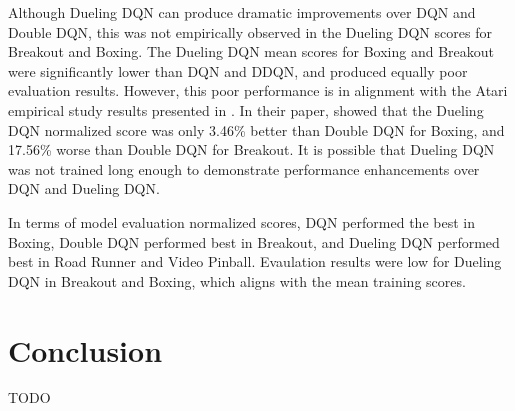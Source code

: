 \documentclass{article}
\begin{document}
Although Dueling DQN can produce dramatic improvements over 
DQN and Double DQN, this was not empirically observed in the Dueling DQN scores
for Breakout and Boxing. The Dueling DQN mean scores for Boxing and Breakout were 
significantly lower than DQN and DDQN, and produced equally poor evaluation results. 
However, this poor performance is in alignment with the Atari empirical study results 
presented in \cite{wang2016dueling}. In their paper, \cite{wang2016dueling} showed 
that the Dueling DQN normalized score was only 3.46\% better than Double DQN for 
Boxing, and 17.56\% worse than Double DQN for Breakout. It is possible that Dueling 
DQN was not trained long enough to demonstrate performance enhancements over DQN and
Dueling DQN.

In terms of model evaluation normalized scores, DQN performed the best in Boxing, 
Double DQN performed best in Breakout, and Dueling DQN performed best in Road Runner 
and Video Pinball. Evaulation results were low for Dueling DQN in Breakout and Boxing, which aligns with the mean training scores.

\section{Conclusion}
TODO


\end{document}
